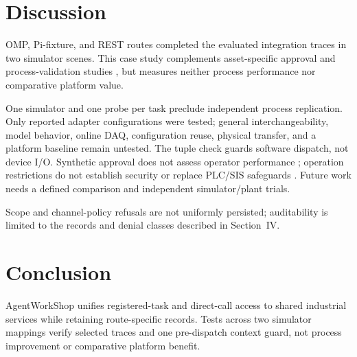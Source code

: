 \section{Discussion}
\label{sec:limits}
OMP, Pi-fixture, and REST routes completed the evaluated integration traces
in two simulator scenes. This case study complements asset-specific approval
and process-validation studies \cite{graul2026aas,schall2026safe}, but
measures neither process performance nor comparative platform value.

One simulator and one probe per task preclude independent process
replication. Only reported adapter configurations were tested; general
interchangeability, model behavior, online DAQ, configuration reuse, physical
transfer, and a platform baseline remain untested. The tuple check guards
software dispatch, not device I/O. Synthetic approval does not assess operator
performance \cite{parasuramanmanzey2010complacency,parasuraman2000model,bainbridge1983ironies};
operation restrictions do not establish security
\cite{greshake2023injection,liu2024pinjection,iec62443-3-3} or replace PLC/SIS
safeguards \cite{iec61511}. Future work needs a defined comparison and
independent simulator/plant trials.

Scope and channel-policy refusals are not uniformly persisted; auditability
is limited to the records and denial classes described in Section~IV.

\section{Conclusion}
\label{sec:conclusion}
AgentWorkShop unifies registered-task and direct-call access to shared
industrial services while retaining route-specific records. Tests across two
simulator mappings verify selected traces and one pre-dispatch context guard,
not process improvement or comparative platform benefit.
